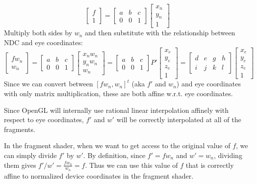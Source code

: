 \documentclass[letterpaper, 11pt]{article}
\begin{document}
\begin{enumerate}
{\begin{minipage}{6in}
\[
\left[ \begin{array}{c} f \\ 1 \end{array}\right]
=
\left[ \begin{array}{ccc}
a & b & c \\
0 & 0 & 1
\end{array}\right]
\left[ \begin{array}{c} x_n \\ y_n \\ 1 \end{array} \right]
\]
Multiply both sides by $w_n$ and then substitute with the relationship between NDC and eye coordinates:
\[
\left[ \begin{array}{c} f w_n \\ w_n \end{array}\right]
=
\left[ \begin{array}{ccc}
a & b & c \\
0 & 0 & 1
\end{array}\right]
\left[ \begin{array}{c} x_n w_n \\ y_n w_n \\ w_n \end{array} \right]
=
\left[ \begin{array}{ccc}
a & b & c \\
0 & 0 & 1
\end{array}\right]
P'
\left[ \begin{array}{c} x_e \\ y_e \\ z_e \\ 1 \end{array} \right]
=
\left[ \begin{array}{cccc}
d & e & g & h \\
i & j & k & l
\end{array}\right]
\left[ \begin{array}{c} x_e \\ y_e \\ z_e \\ 1 \end{array} \right]
\]
Since we can convert between $\left[fw_n, w_n\right]^t$ (aka $f'$ and $w_n$) and eye coordinates with only matrix multiplication, these are both affine w.r.t. eye coordinates.

Since OpenGL will internally use rational linear interpolation affinely with respect to eye coordinates, $f'$ and $w'$ will be correctly interpolated at all of the fragments. 

In the fragment shader, when we want to get access to the original value of $f$, we can simply divide $f'$ by $w'$. By definition, since $f' = f w_n$ and $w' = w_n$, dividing them gives $f' / w' = \frac{f w_n}{w_n} = f$. Thus we can use this value of $f$ that is correctly affine to normalized device coordinates in the fragment shader.

\end{minipage}
}
\end{enumerate}
\end{document}
